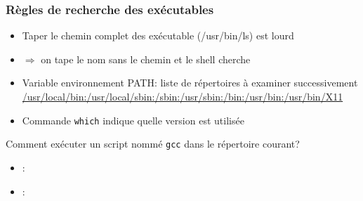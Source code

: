 \begin{frame}\frametitle{Règles de recherche des exécutables}
    \begin{itemize}
    \item Taper le chemin complet des exécutable (/usr/bin/ls) est lourd
    \item $\Rightarrow$ on tape le nom sans le chemin et le shell cherche
    \item Variable environnement PATH: liste de répertoires à examiner
      successivement\\
      {\footnotesize \url{/usr/local/bin:/usr/local/sbin:/sbin:/usr/sbin:/bin:/usr/bin:/usr/bin/X11}}

    \item Commande \texttt{which} indique quelle version est utilisée
    \end{itemize}

    \begin{exo}{Comment exécuter un script nommé \texttt{gcc} dans le répertoire
        courant?}
      \begin{itemize}
      \item {}: 
      \item {}: 
      \end{itemize}
    \end{exo}
\end{frame}
